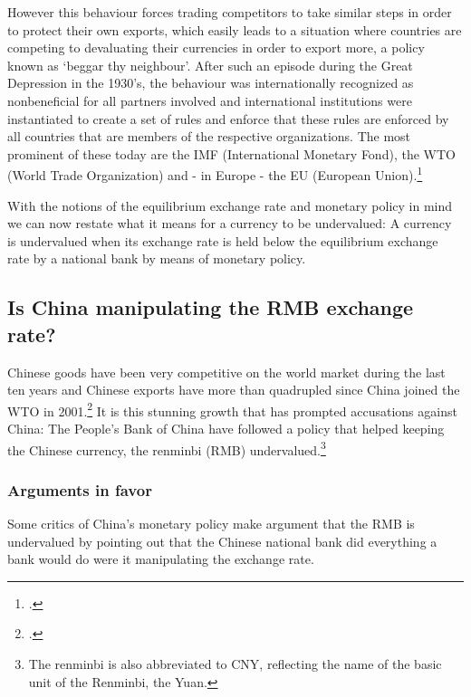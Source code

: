 However this behaviour forces trading competitors to take similar steps 
in order to protect their own exports, which easily leads to a situation 
where countries are competing to devaluating their currencies in order 
to export more, a policy known as ‘beggar thy neighbour’. After such an 
episode during the Great Depression in the 1930's, the behaviour was 
internationally recognized as nonbeneficial for all partners involved 
and international institutions were instantiated to create a set of 
rules and enforce that these rules are enforced by all countries that 
are members of the respective organizations. The most prominent of these 
today are the IMF (International Monetary Fond), the WTO (World Trade 
Organization) and - in Europe - the EU (European Union).\footnote{\cite[p. 516]{Krugman2008}.}

With the notions of the equilibrium exchange rate and monetary policy in 
mind we can now restate what it means for a currency to be undervalued: 
A currency is undervalued when its exchange rate is held below the 
equilibrium exchange rate by a national bank by means of monetary 
policy.

\subsection{Is China manipulating the RMB exchange rate?}

Chinese goods have been very competitive on the world market during the 
last ten years and Chinese exports have more than quadrupled since China 
joined the WTO in 2001.\footnote{\cite{FRED2012}.} It is this stunning 
growth that has prompted accusations against China: The People's Bank of 
China have followed a policy that helped keeping the Chinese currency, 
the renminbi (RMB) undervalued.\footnote{The renminbi is also 
abbreviated to CNY, reflecting the name of the basic unit of the 
Renminbi, the Yuan.}

\subsubsection{Arguments in favor}

Some critics of China's monetary policy make argument that the RMB is 
undervalued by pointing out that the Chinese national bank did 
everything a bank would do were it manipulating the exchange rate. 

